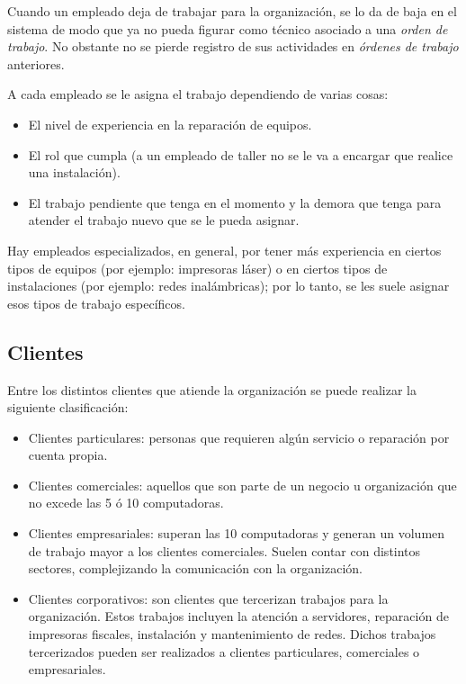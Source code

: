 \documentclass[12pt]{extarticle}
\begin{document}
\begin{spacing}{1.2}
    Cuando un empleado deja de trabajar para la organización, se lo da de baja en el sistema de modo que ya no pueda figurar como técnico asociado a una \textit{orden de trabajo}. No obstante no se pierde registro de sus actividades en \textit{órdenes de trabajo} anteriores. 

    A cada empleado se le asigna el trabajo dependiendo de varias cosas:
    \begin{itemize}
        \item El nivel de experiencia en la reparación de equipos.
        \item El rol que cumpla (a un empleado de taller no se le va a encargar que realice una instalación).
        \item El trabajo pendiente que tenga en el momento y la demora que tenga para atender el trabajo nuevo que se le pueda asignar. 
    \end{itemize}

    Hay empleados especializados, en general, por tener más experiencia en ciertos tipos de equipos (por ejemplo: impresoras láser) o en ciertos tipos de instalaciones (por ejemplo: redes inalámbricas); por lo tanto, se les suele asignar esos tipos de trabajo específicos.

    \pagebreak
    \subsection{Clientes}

    Entre los distintos clientes que atiende la organización se puede realizar la siguiente clasificación:
    \begin{itemize}
        \item Clientes particulares: personas que requieren algún servicio o reparación por cuenta propia.
        \item Clientes comerciales: aquellos que son parte de un negocio u organización que no excede las 5 ó 10 computadoras.
        \item Clientes empresariales: superan las 10 computadoras y generan un volumen de trabajo mayor a los clientes comerciales. Suelen contar con distintos sectores, complejizando la comunicación con la organización.
        \item Clientes corporativos: son clientes que tercerizan trabajos para la organización. Estos trabajos incluyen la atención a servidores, reparación de impresoras fiscales, instalación y mantenimiento de redes. Dichos trabajos tercerizados pueden ser realizados a clientes particulares, comerciales o empresariales.
    \end{itemize}


\end{spacing}
\end{document}
